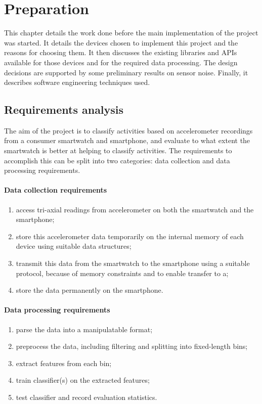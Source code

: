 \chapter{Preparation}
  This chapter details the work done before the main implementation of the project was started. It
  details the devices chosen to implement this project and the reasons for choosing them. It then
  discusses the existing libraries and APIs available for those devices and for the required data
  processing. The design decisions are supported by some preliminary results on sensor noise.  Finally, it describes software engineering techniques used.

  \section{Requirements analysis}
    The aim of the project is to classify activities based on accelerometer recordings from a consumer smartwatch and smartphone, and evaluate to what extent the smartwatch is better at helping to classify activities. The requirements to accomplish this can be split into two categories: data collection and data processing requirements.
    
    \subsubsection{Data collection requirements}
      \begin{enumerate}
        \item access tri-axial readings from accelerometer on both the smartwatch and the smartphone;
        \item store this accelerometer data temporarily on the internal memory of each device using suitable data structures;
        \item transmit this data from the smartwatch to the smartphone using a suitable protocol, because of memory constraints and to enable transfer to a;
        \item store the data permanently on the smartphone.
      \end{enumerate}
    
    \subsubsection{Data processing requirements}
      \begin{enumerate}
        \item parse the data into a manipulatable format;
        \item preprocess the data, including filtering and splitting into fixed-length bins;
        \item extract features from each bin;
        \item train classifier(s) on the extracted features;
        \item test classifier and record evaluation statistics.
      \end{enumerate}
    
